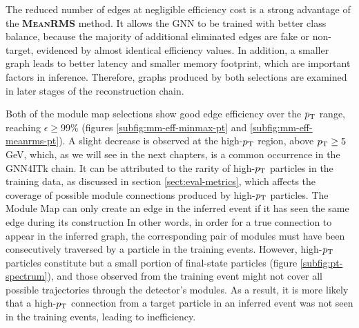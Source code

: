The reduced number of edges at negligible efficiency cost is a strong advantage of the \textbf{\textsc{MeanRMS}} method. 
It allows the GNN to be trained with better class balance, because the majority of additional eliminated edges are fake or non-target, evidenced by almost identical efficiency values. 
In addition, a smaller graph leads to better latency and smaller memory footprint, which are important factors in inference. 
Therefore, graphs produced by both selections are examined in later stages of the reconstruction chain.

Both of the module map selections show good edge efficiency over the $p_{\text{T}}$ range, reaching $\epsilon \ge 99\%$ (figures \ref{subfig:mm-eff-minmax-pt} and \ref{subfig:mm-eff-meanrms-pt}).
A slight decrease is observed at the high-$p_{\text{T}}$ region, above $p_{\text{T}} \ge 5$ GeV, which, as we will see in the next chapters, is a common occurrence in the GNN4ITk chain.
It can be attributed to the rarity of high-$p_{\text{T}}$ particles in the training data, as discussed in section \ref{sect:eval-metrics}, which affects the coverage of possible module connections produced by high-$p_{\text{T}}$ particles.
The Module Map can only create an edge in the inferred event if it has seen the same edge during its construction
In other words, in order for a true connection to appear in the inferred graph, the corresponding pair of modules must have been consecutively traversed by a particle in the training events.
However, high-$p_{\text{T}}$ particles constitute but a small portion of final-state particles (figure \ref{subfig:pt-spectrum}), and those observed from the training event might not cover all possible trajectories through the detector's modules.
As a result, it is more likely that a high-$p_{\text{T}}$ connection from a target particle in an inferred event was not seen in the training events, leading to inefficiency.

